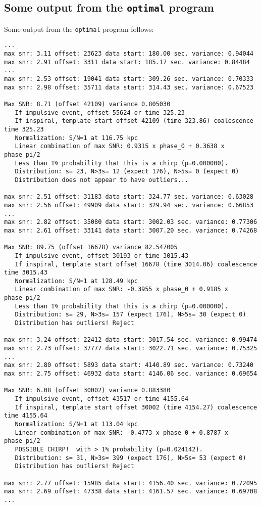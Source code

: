 \subsection{Some output from the {\tt optimal} program}
Some output from the {\tt optimal} program follows:
\begin{verbatim}
...
max snr: 3.11 offset: 23623 data start: 180.00 sec. variance: 0.94044
max snr: 2.91 offset: 3311 data start: 185.17 sec. variance: 0.84484
...
max snr: 2.53 offset: 19041 data start: 309.26 sec. variance: 0.70333
max snr: 2.98 offset: 35711 data start: 314.43 sec. variance: 0.67523

Max SNR: 8.71 (offset 42109) variance 0.805030
   If impulsive event, offset 55624 or time 325.23
   If inspiral, template start offset 42109 (time 323.86) coalescence time 325.23
   Normalization: S/N=1 at 116.75 kpc
   Linear combination of max SNR: 0.9315 x phase_0 + 0.3638 x phase_pi/2
   Less than 1% probability that this is a chirp (p=0.000000).
   Distribution: s= 23, N>3s= 12 (expect 176), N>5s= 0 (expect 0)
   Distribution does not appear to have outliers...

max snr: 2.51 offset: 31183 data start: 324.77 sec. variance: 0.63028
max snr: 2.56 offset: 49909 data start: 329.94 sec. variance: 0.66853
...
max snr: 2.82 offset: 35080 data start: 3002.03 sec. variance: 0.77306
max snr: 2.61 offset: 33141 data start: 3007.20 sec. variance: 0.74268

Max SNR: 89.75 (offset 16678) variance 82.547005
   If impulsive event, offset 30193 or time 3015.43
   If inspiral, template start offset 16678 (time 3014.06) coalescence time 3015.43
   Normalization: S/N=1 at 128.49 kpc
   Linear combination of max SNR: -0.3955 x phase_0 + 0.9185 x phase_pi/2
   Less than 1% probability that this is a chirp (p=0.000000).
   Distribution: s= 29, N>3s= 157 (expect 176), N>5s= 30 (expect 0)
   Distribution has outliers! Reject

max snr: 3.24 offset: 22412 data start: 3017.54 sec. variance: 0.99474
max snr: 2.73 offset: 37777 data start: 3022.71 sec. variance: 0.75325
...
max snr: 2.80 offset: 5893 data start: 4140.89 sec. variance: 0.73240
max snr: 2.75 offset: 46932 data start: 4146.06 sec. variance: 0.69654

Max SNR: 6.08 (offset 30002) variance 0.883380
   If impulsive event, offset 43517 or time 4155.64
   If inspiral, template start offset 30002 (time 4154.27) coalescence time 4155.64
   Normalization: S/N=1 at 113.04 kpc
   Linear combination of max SNR: -0.4773 x phase_0 + 0.8787 x phase_pi/2
   POSSIBLE CHIRP!  with > 1% probability (p=0.024142).
   Distribution: s= 31, N>3s= 399 (expect 176), N>5s= 53 (expect 0)
   Distribution has outliers! Reject

max snr: 2.77 offset: 15985 data start: 4156.40 sec. variance: 0.72095
max snr: 2.69 offset: 47338 data start: 4161.57 sec. variance: 0.69708
...
\end{verbatim}
